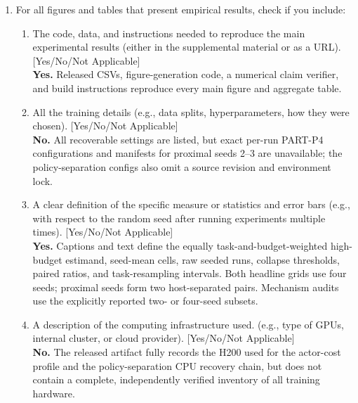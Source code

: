 \begin{enumerate}
  \item For all figures and tables that present empirical results, check if you include:
  \begin{enumerate}
    \item The code, data, and instructions needed to reproduce the main experimental results (either in the supplemental material or as a URL). [Yes/No/Not Applicable]\\
    \textbf{Yes.} Released CSVs, figure-generation code, a numerical claim verifier, and build instructions reproduce every main figure and aggregate table.
    \item All the training details (e.g., data splits, hyperparameters, how they were chosen). [Yes/No/Not Applicable]\\
    \textbf{No.} All recoverable settings are listed, but exact per-run PART-P4 configurations and manifests for proximal seeds 2--3 are unavailable; the policy-separation configs also omit a source revision and environment lock.
    \item A clear definition of the specific measure or statistics and error bars (e.g., with respect to the random seed after running experiments multiple times). [Yes/No/Not Applicable]\\
    \textbf{Yes.} Captions and text define the equally task-and-budget-weighted high-budget estimand, seed-mean cells, raw seeded runs, collapse thresholds, paired ratios, and task-resampling intervals. Both headline grids use four seeds; proximal seeds form two host-separated pairs. Mechanism audits use the explicitly reported two- or four-seed subsets.
    \item A description of the computing infrastructure used. (e.g., type of GPUs, internal cluster, or cloud provider). [Yes/No/Not Applicable]\\
    \textbf{No.} The released artifact fully records the H200 used for the actor-cost profile and the policy-separation CPU recovery chain, but does not contain a complete, independently verified inventory of all training hardware.
  \end{enumerate}


\end{enumerate}
